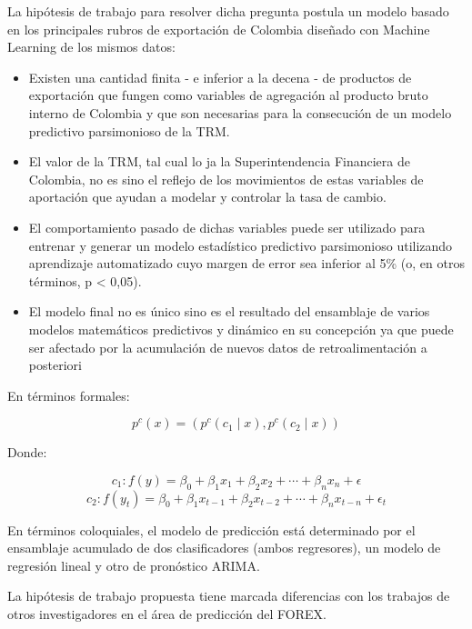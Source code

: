 \begin{spacing}{1.5}
La hipótesis de trabajo para resolver dicha pregunta postula un modelo basado en los principales rubros de exportación de Colombia diseñado con Machine Learning de los mismos datos:
\begin{itemize}
\item Existen una cantidad finita - e inferior a la decena - de productos de exportación que fungen como variables de agregación al producto bruto interno de Colombia y que son necesarias para la consecución de un modelo predictivo parsimonioso de la TRM.
\item El valor de la TRM, tal cual lo ja la Superintendencia Financiera de Colombia, no es sino el reflejo de los movimientos de estas variables de aportación que ayudan a modelar y controlar la tasa de cambio.
\item El comportamiento pasado de dichas variables puede ser utilizado para entrenar y generar un modelo estadístico predictivo parsimonioso utilizando aprendizaje automatizado cuyo margen de error sea inferior al 5\% (o, en otros términos, p < 0,05).
\item El modelo final no es único sino es el resultado del ensamblaje de varios modelos matemáticos predictivos y dinámico en su concepción ya que puede ser afectado por la acumulación de nuevos datos de retroalimentación a posteriori 
\end{itemize}

En términos formales:

\[ p^{c}(x) = (p^{c}(c_{1} \mid x),p^{c}(c_{2} \mid x)) \]

Donde:

\[ c_{1} : f(y) = \beta_{0} + \beta_{1}x_{1} + \beta_{2}x_{2} + \cdots + \beta_{n}x_{n} + \epsilon \]
\[ c_{2} : f(y_{t}) = \beta_{0} + \beta_{1}x_{t-1} + \beta_{2}x_{t-2} + \cdots + \beta_{n}x_{t-n} + \epsilon_{t}\]

En términos coloquiales, el modelo de predicción está determinado por el ensamblaje acumulado de dos clasificadores (ambos regresores), un modelo de regresión lineal y otro de pronóstico ARIMA.

La hipótesis de trabajo propuesta tiene marcada diferencias con los trabajos de otros investigadores en el área de predicción del FOREX. 


\end{spacing}
